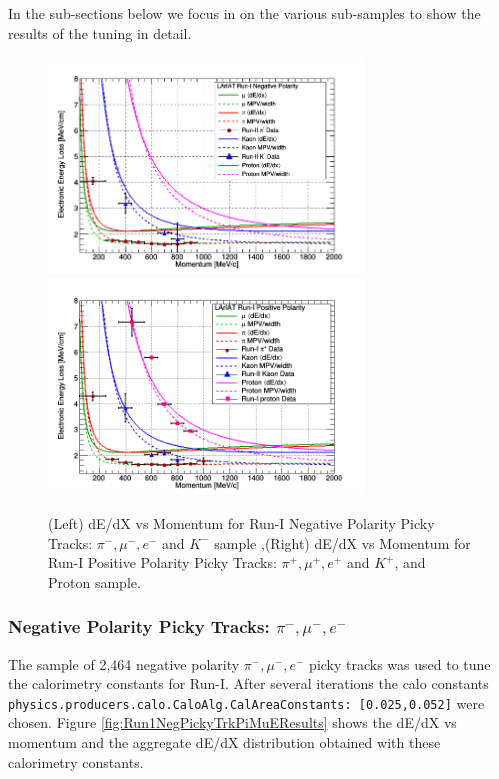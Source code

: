 In the sub-sections below we focus in on the various sub-samples to show the results of the tuning in detail.

\begin{figure}[h!]
\centering
\includegraphics[width=0.75\textwidth]{images/RunINegTotaldEdXvsMomentum.png}
\includegraphics[width=0.75\textwidth]{images/RunIPosTotaldEdXvsMomentum.png}
\caption{(Left) dE/dX vs Momentum for Run-I Negative Polarity Picky Tracks: $\pi^{-}, \mu^{-}, e^{-}$ and $K^{-}$ sample ,(Right) dE/dX vs Momentum for Run-I Positive Polarity Picky Tracks: $\pi^{+}, \mu^{+}, e^{+}$ and $K^{+}$, and Proton sample. }
\label{fig:Run1NegPosPickyTrkTotal}
\end{figure}

\clearpage

\subsubsection{Negative Polarity Picky Tracks: $\pi^{-}, \mu^{-}, e^{-}$}\label{sec:Run1NegPickyTrkPiMuE}

The sample of 2,464 negative polarity $\pi^{-}, \mu^{-}, e^{-}$ picky tracks was used to tune the calorimetry constants for Run-I. After several iterations the calo constants \verb!physics.producers.calo.CaloAlg.CalAreaConstants: [0.025,0.052]! were chosen. Figure \ref{fig:Run1NegPickyTrkPiMuEResults} shows the dE/dX vs momentum and the aggregate dE/dX distribution obtained with these calorimetry constants.

